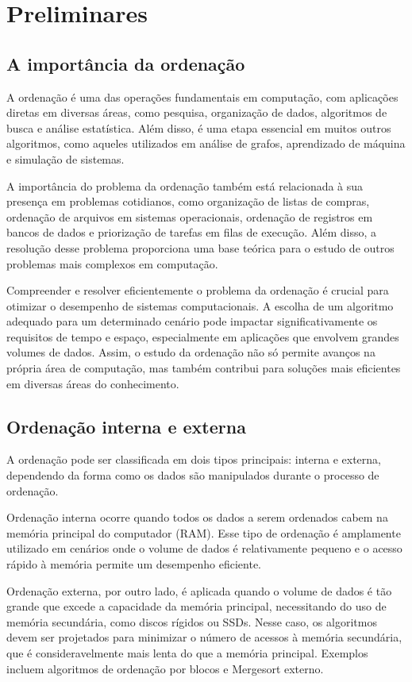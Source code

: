 \chapter{Preliminares}\label{cap:preliminares}

\section{A importância da ordenação}
A ordenação é uma das operações fundamentais em computação, com aplicações diretas em diversas áreas, como pesquisa, organização de dados, algoritmos de busca e análise estatística. Além disso, é uma etapa essencial em muitos outros algoritmos, como aqueles utilizados em análise de grafos, aprendizado de máquina e simulação de sistemas.

A importância do problema da ordenação também está relacionada à sua presença em problemas cotidianos, como organização de listas de compras, ordenação de arquivos em sistemas operacionais, ordenação de registros em bancos de dados e priorização de tarefas em filas de execução. Além disso, a resolução desse problema proporciona uma base teórica para o estudo de outros problemas mais complexos em computação.

Compreender e resolver eficientemente o problema da ordenação é crucial para otimizar o desempenho de sistemas computacionais. A escolha de um algoritmo adequado para um determinado cenário pode impactar significativamente os requisitos de tempo e espaço, especialmente em aplicações que envolvem grandes volumes de dados. Assim, o estudo da ordenação não só permite avanços na própria área de computação, mas também contribui para soluções mais eficientes em diversas áreas do conhecimento.

\section{Ordenação interna e externa}
A ordenação pode ser classificada em dois tipos principais: interna e externa, dependendo da forma como os dados são manipulados durante o processo de ordenação.

Ordenação interna ocorre quando todos os dados a serem ordenados cabem na memória principal do computador (RAM). Esse tipo de ordenação é amplamente utilizado em cenários onde o volume de dados é relativamente pequeno e o acesso rápido à memória permite um desempenho eficiente.

Ordenação externa, por outro lado, é aplicada quando o volume de dados é tão grande que excede a capacidade da memória principal, necessitando do uso de memória secundária, como discos rígidos ou SSDs. Nesse caso, os algoritmos devem ser projetados para minimizar o número de acessos à memória secundária, que é consideravelmente mais lenta do que a memória principal. Exemplos incluem algoritmos de ordenação por blocos e Mergesort externo.

